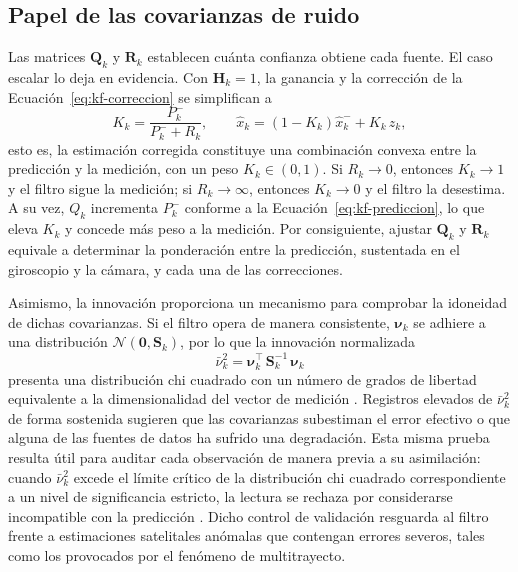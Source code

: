 \subsection{Papel de las covarianzas de ruido}
\label{sec:covarianzas}

Las matrices $\mathbf{Q}_k$ y $\mathbf{R}_k$ establecen cuánta confianza obtiene cada fuente.
El caso escalar lo deja en evidencia.
Con $\mathbf{H}_k = 1$, la ganancia y la corrección de la Ecuación~\eqref{eq:kf-correccion} se simplifican a
\begin{equation}
K_k = \frac{P_k^{-}}{P_k^{-} + R_k},
\qquad
\hat{x}_k = \left(1 - K_k\right)\hat{x}_k^{-} + K_k\,z_k,
\label{eq:kf-escalar}
\end{equation}
esto es, la estimación corregida constituye una combinación convexa entre la predicción y la medición, con un peso $K_k \in (0,1)$.
Si $R_k \to 0$, entonces $K_k \to 1$ y el filtro sigue la medición; si $R_k \to \infty$, entonces $K_k \to 0$ y el filtro la desestima.
A su vez, $Q_k$ incrementa $P_k^{-}$ conforme a la Ecuación~\eqref{eq:kf-prediccion}, lo que eleva $K_k$ y concede más peso a la medición.
Por consiguiente, ajustar $\mathbf{Q}_k$ y $\mathbf{R}_k$ equivale a determinar la ponderación entre la predicción, sustentada en el giroscopio y la cámara, y cada una de las correcciones.

Asimismo, la innovación proporciona un mecanismo para comprobar la idoneidad de dichas covarianzas.
Si el filtro opera de manera consistente, $\boldsymbol{\nu}_k$ se adhiere a una distribución $\mathcal{N}(\mathbf{0},\mathbf{S}_k)$, por lo que la innovación normalizada
\begin{equation}
\bar{\nu}_k^{2} = \boldsymbol{\nu}_k^{\top}\,\mathbf{S}_k^{-1}\,\boldsymbol{\nu}_k
\label{eq:nis}
\end{equation}
presenta una distribución chi cuadrado con un número de grados de libertad equivalente a la dimensionalidad del vector de medición \cite{groves2013gnss}.
Registros elevados de $\bar{\nu}_k^{2}$ de forma sostenida sugieren que las covarianzas subestiman el error efectivo o que alguna de las fuentes de datos ha sufrido una degradación.
Esta misma prueba resulta útil para auditar cada observación de manera previa a su asimilación: cuando $\bar{\nu}_k^{2}$ excede el límite crítico de la distribución chi cuadrado correspondiente a un nivel de significancia estricto, la lectura se rechaza por considerarse incompatible con la predicción \cite{groves2013gnss}.
Dicho control de validación resguarda al filtro frente a estimaciones satelitales anómalas que contengan errores severos, tales como los provocados por el fenómeno de multitrayecto.


